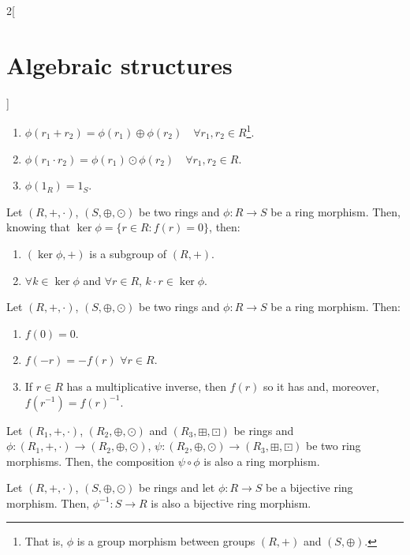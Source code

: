 \documentclass[../../../main_math.tex]{subfiles}
\begin{document}
\begin{multicols}{2}[\section{Algebraic structures}]
\begin{definition}
    \begin{enumerate}
      \item $\phi(r_1+ r_2)=\phi(r_1)\oplus\phi(r_2)\quad\forall r_1,r_2\in R$\footnote{That is, $\phi$ is a group morphism between groups $(R,+)$ and $(S,\oplus)$.}.
      \item $\phi(r_1\cdot r_2)=\phi(r_1)\odot\phi(r_2)\quad\forall r_1,r_2\in R$.
      \item $\phi(1_R)=1_S$.
    \end{enumerate}
  \end{definition}
  \begin{lemma}
    Let $(R,+,\cdot)$, $(S,\oplus,\odot)$ be two rings and $\phi:R\rightarrow S$ be a ring morphism. Then, knowing that $\ker\phi=\{r\in R:f(r)=0\}$, then:
    \begin{enumerate}
      \item $(\ker\phi,+)$ is a subgroup of $(R,+)$.
      \item $\forall k\in\ker\phi$ and $\forall r\in R$, $k\cdot r\in\ker\phi$.
    \end{enumerate}
  \end{lemma}
  \begin{proposition}
    Let $(R,+,\cdot)$, $(S,\oplus,\odot)$ be two rings and $\phi:R\rightarrow S$ be a ring morphism. Then:
    \begin{enumerate}
      \item $f(0)=0$.
      \item $f(-r)=-f(r)$ $\forall r\in R$.
      \item If $r\in R$ has a multiplicative inverse, then $f(r)$ so it has and, moreover, $f(r^{-1})=f(r)^{-1}$.
    \end{enumerate}
  \end{proposition}
  \begin{proposition}
    Let $(R_1,+,\cdot)$, $(R_2,\oplus,\odot)$ and $(R_3,\boxplus,\boxdot)$ be rings and $\phi:(R_1,+,\cdot)\rightarrow (R_2,\oplus,\odot)$, $\psi:(R_2,\oplus,\odot)\rightarrow (R_3,\boxplus,\boxdot)$ be two ring morphisms. Then, the composition $\psi\circ\phi$ is also a ring morphism.
  \end{proposition}
  \begin{proposition}
    Let $(R,+,\cdot)$, $(S,\oplus,\odot)$ be rings and let $\phi: R\rightarrow S$ be a bijective ring morphism. Then, $\phi^{-1}: S\rightarrow R$ is also a bijective ring morphism.
  \end{proposition}

\end{multicols}
\end{document}
